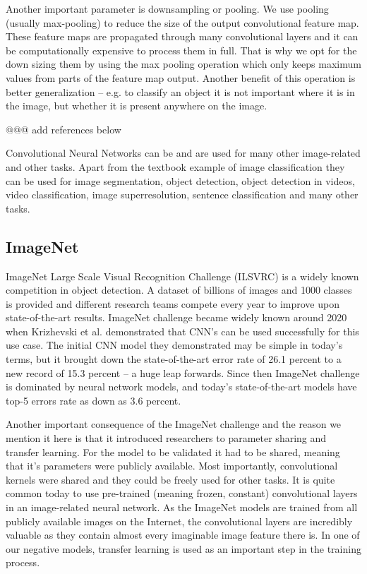 \documentclass[b5paper]{book}
\begin{document}
Another important parameter is downsampling or pooling. We use pooling (usually max-pooling) to reduce the size of the output convolutional feature map. These feature maps are propagated through many convolutional layers and it can be computationally expensive to process them in full. That is why we opt for the down sizing them by using the max pooling operation which only keeps maximum values from parts of the feature map output. Another benefit of this operation is better generalization -- e.g. to classify an object it is not important where it is in the image, but whether it is present anywhere on the image.

@@@ add references below

Convolutional Neural Networks can be and are used for many other image-related and other tasks. Apart from the textbook example of image classification they can be used for image segmentation, object detection, object detection in videos, video classification, image superresolution, sentence classification and many other tasks.

\subsection{ImageNet}

ImageNet Large Scale Visual Recognition Challenge (ILSVRC) is a widely known competition in object detection. A dataset of billions of images and 1000 classes is provided and different research teams compete every year to improve upon state-of-the-art results. ImageNet challenge became widely known around 2020 when Krizhevski et al. demonstrated that CNN's can be used successfully for this use case. The initial CNN model they demonstrated may be simple in today's terms, but it brought down the state-of-the-art error rate of 26.1 percent to a new record of 15.3 percent -- a huge leap forwards. Since then ImageNet challenge is dominated by neural network models, and today's state-of-the-art models have top-5 errors rate as down as 3.6 percent.

Another important consequence of the ImageNet challenge and the reason we mention it here is that it introduced researchers to parameter sharing and transfer learning. For the model to be validated it had to be shared, meaning that it's parameters were publicly available. Most importantly, convolutional kernels were shared and they could be freely used for other tasks. It is quite common today to use pre-trained (meaning frozen, constant) convolutional layers in an image-related neural network. As the ImageNet models are trained from all publicly available images on the Internet, the convolutional layers are incredibly valuable as they contain almost every imaginable image feature there is. In one of our negative models, transfer learning is used as an important step in the training process. 
\end{document}
